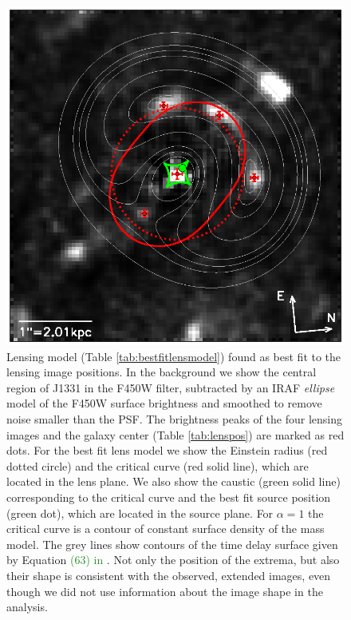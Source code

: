 \documentclass[useAMS,usenatbib]{mnras}
\newcommand{\NEW}[1]{\textcolor{ForestGreen}{#1}}
\newcommand{\OLD}[1]{}
\begin{document}
\begin{figure}
\centering
  \includegraphics[width=\linewidth]{fig/lens_all_in_one.ps}
\caption{Lensing model (Table \ref{tab:bestfitlensmodel}) found as best fit to the lensing image positions. In the background we show the central region of J1331 in the F450W filter, subtracted by an IRAF \emph{ellipse} model of the F450W surface brightness and smoothed to remove noise smaller than the PSF. The brightness peaks of the four lensing images and the galaxy center (Table \ref{tab:lenspos}) are marked as red dots. For the best fit lens model we show the Einstein radius (red dotted circle) and the critical curve (red solid line), which are located in the lens plane. We also show the caustic (green solid line) corresponding to the critical curve and the best fit source position (green dot), which are located in the source plane. For $\alpha=1$ the critical curve is a contour of constant surface density of the mass model. The grey  lines show contours of the time delay surface given by Equation \OLD{\eqref{eq:timedelay}}\NEW{(63) in \citet{1996astro.ph..6001N}}. Not only the position of the extrema, but also their shape is consistent with the observed, extended images, even though we did not use information about the image shape in the analysis.}
\label{fig:bestfitlensmodel}
\end{figure}
\end{document}
